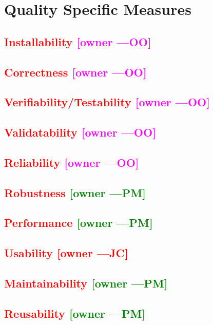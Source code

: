 \documentclass[letterpaper,cleveref]{lipics-v2019}
\newcommand{\authornote}[3]{\textcolor{#1}{[#3 ---#2]}}
\newcommand{\authornote}[3]{}
\newcommand{\jc}[1]{\authornote{red}{JC}{#1}} %
\newcommand{\oo}[1]{\authornote{magenta}{OO}{#1}} %
\newcommand{\pmi}[1]{\authornote{green}{PM}{#1}} %
\newcommand{\notdone}[1]{\textcolor{red}{#1}}
\theoremstyle{definition}
\begin{document}
\section{Quality Specific Measures}

\subsection{\notdone{Installability} \oo{owner}}

\subsection{\notdone{Correctness} \oo{owner}}

\subsection{\notdone{Verifiability/Testability} \oo{owner}}

\subsection{\notdone{Validatability} \oo{owner}}

\subsection{\notdone{Reliability} \oo{owner}}

\subsection{\notdone{Robustness} \pmi{owner}}

\subsection{\notdone{Performance} \pmi{owner}}

\subsection{\notdone{Usability} \jc{owner}} 

\subsection{\notdone{Maintainability} \pmi{owner}}

\subsection{\notdone{Reusability} \pmi{owner}}
\end{document}

